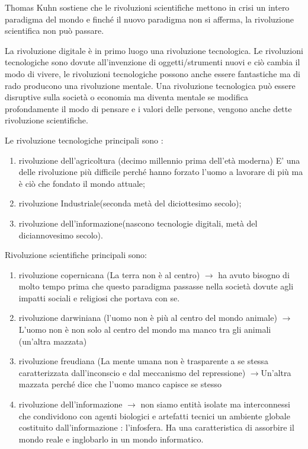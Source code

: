 \documentclass[a4page, 11pt]{article}
\begin{document}
Thomas Kuhn sostiene che le rivoluzioni scientifiche mettono in crisi un
intero paradigma del mondo e finché il nuovo paradigma non si afferma,
la rivoluzione scientifica non può passare.

La rivoluzione digitale è in primo luogo una rivoluzione tecnologica. Le
rivoluzioni tecnologiche sono dovute all'invenzione di oggetti/strumenti
nuovi e ciò cambia il modo di vivere, le rivoluzioni tecnologiche
possono anche essere fantastiche ma di rado producono una rivoluzione
mentale. Una rivoluzione tecnologica può essere disruptive sulla società
o economia ma diventa mentale se modifica profondamente il modo di
pensare e i valori delle persone, vengono anche dette rivoluzione
scientifiche.

Le rivoluzione tecnologiche principali sono :

\begin{enumerate}
	\def\labelenumi{\arabic{enumi}.}
	 
	\item
	rivoluzione dell'agricoltura (decimo millennio prima dell'età moderna)
	E' una delle rivoluzione più difficile perché hanno forzato l'uomo a
	lavorare di più ma è ciò che fondato il mondo attuale;
	\item
	rivoluzione Industriale(seconda metà del diciottesimo secolo);
	\item
	rivoluzione dell'informazione(nascono tecnologie digitali, metà del
	diciannovesimo secolo).
\end{enumerate}

Rivoluzione scientifiche principali sono:

\begin{enumerate}
	\def\labelenumi{\arabic{enumi}.}
	 
	\item
	rivoluzione copernicana (La terra non è al centro) $\rightarrow$ ha avuto bisogno
	di molto tempo prima che questo paradigma passasse nella società
	dovute agli impatti sociali e religiosi che portava con se.
	\item
	rivoluzione darwiniana (l'uomo non è più al centro del mondo animale)
	$\rightarrow$ L'uomo non è non solo al centro del mondo ma manco tra gli animali
	(un'altra mazzata)
	\item
	rivoluzione freudiana (La mente umana non è trasparente a se stessa
	caratterizzata dall'inconscio e dal meccanismo del repressione)
	$\rightarrow$Un'altra mazzata perché dice che l'uomo manco capisce se stesso
	\item
	rivoluzione dell'informazione $\rightarrow$ non siamo entità isolate ma
	interconnessi che condividono con agenti biologici e artefatti tecnici
	un ambiente globale costituito dall'informazione : l'infosfera. Ha una
	caratteristica di assorbire il mondo reale e inglobarlo in un mondo
	informatico.
\end{enumerate}
\end{document}
